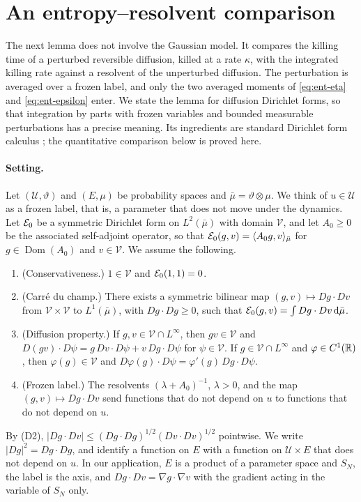\section{An entropy--resolvent comparison}\label{sec:ent-resolvent}

The next lemma does not involve the Gaussian model. It compares the killing
time of a perturbed reversible diffusion, killed at a rate $\kappa$, with the
integrated killing rate against a resolvent of the unperturbed diffusion. The perturbation is
averaged over a frozen label, and only the two averaged moments of
\eqref{eq:ent-eta} and \eqref{eq:ent-epsilon} enter. We state the lemma for
diffusion Dirichlet forms, so that integration by parts with frozen
variables and bounded measurable perturbations has a precise meaning. Its
ingredients are standard Dirichlet form calculus \cite{FukushimaOshimaTakeda2011}; the quantitative comparison below is proved here.

\paragraph{Setting.}
Let $(\mathcal U,\vartheta)$ and $(E,\mu)$ be probability spaces and
$\bar\mu=\vartheta\otimes\mu$. We think of $u\in\mathcal U$ as a frozen
label, that is, a parameter that does not move under the dynamics. Let $\mathcal E_0$ be a symmetric Dirichlet form on $L^2(\bar\mu)$ with domain
$\mathcal V$, and let $A_0\ge0$ be the associated self-adjoint operator, so
that $\mathcal E_0(g,v)=\langle A_0g,v\rangle_{\bar\mu}$ for $g\in\operatorname{Dom}(A_0)$
and $v\in\mathcal V$. We assume the following.
\begin{enumerate}
\item[(D1)] (Conservativeness.) $1\in\mathcal V$ and $\mathcal E_0(1,1)=0$.
\item[(D2)] (Carr\'e du champ.) There exists a symmetric bilinear map
$(g,v)\mapsto Dg\cdot Dv$ from $\mathcal V\times\mathcal V$ to
$L^1(\bar\mu)$, with $Dg\cdot Dg\ge0$, such that
$\mathcal E_0(g,v)=\int Dg\cdot Dv\,\mathrm d\bar\mu$.
\item[(D3)] (Diffusion property.) If $g,v\in\mathcal V\cap L^\infty$, then
$gv\in\mathcal V$ and $D(gv)\cdot D\psi=g\,Dv\cdot D\psi+v\,Dg\cdot D\psi$
for $\psi\in\mathcal V$. If $g\in\mathcal V\cap L^\infty$ and
$\varphi\in C^1(\mathbb R)$, then $\varphi(g)\in\mathcal V$ and
$D\varphi(g)\cdot D\psi=\varphi'(g)\,Dg\cdot D\psi$.
\item[(D4)] (Frozen label.) The resolvents $(\lambda+A_0)^{-1}$,
$\lambda>0$, and the map $(g,v)\mapsto Dg\cdot Dv$ send functions that do
not depend on $u$ to functions that do not depend on $u$.
\end{enumerate}
By (D2), $|Dg\cdot Dv|\le(Dg\cdot Dg)^{1/2}(Dv\cdot Dv)^{1/2}$ pointwise. We
write $|Dg|^2=Dg\cdot Dg$, and identify a function on $E$ with a function on
$\mathcal U\times E$ that does not depend on $u$. In our application, $E$ is
a product of a parameter space and $S_N$, the label is the axis, and $Dg\cdot
Dv=\nabla g\cdot\nabla v$ with the gradient acting in the variable of $S_N$
only.

